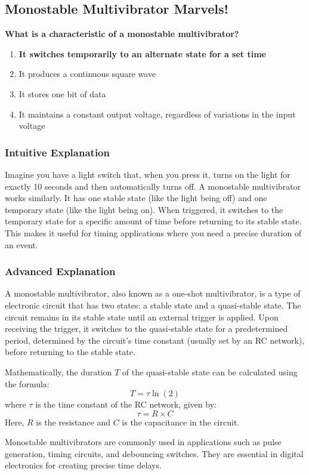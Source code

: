 \subsection{Monostable Multivibrator Marvels!}

\begin{tcolorbox}[colback=gray!10!white,colframe=black!75!black,title=\textbf{E7A06}]
\textbf{What is a characteristic of a monostable multivibrator?}
\begin{enumerate}[label=\Alph*.]
    \item \textbf{It switches temporarily to an alternate state for a set time}
    \item It produces a continuous square wave
    \item It stores one bit of data
    \item It maintains a constant output voltage, regardless of variations in the input voltage
\end{enumerate}
\end{tcolorbox}

\subsubsection{Intuitive Explanation}
Imagine you have a light switch that, when you press it, turns on the light for exactly 10 seconds and then automatically turns off. A monostable multivibrator works similarly. It has one stable state (like the light being off) and one temporary state (like the light being on). When triggered, it switches to the temporary state for a specific amount of time before returning to its stable state. This makes it useful for timing applications where you need a precise duration of an event.

\subsubsection{Advanced Explanation}
A monostable multivibrator, also known as a one-shot multivibrator, is a type of electronic circuit that has two states: a stable state and a quasi-stable state. The circuit remains in its stable state until an external trigger is applied. Upon receiving the trigger, it switches to the quasi-stable state for a predetermined period, determined by the circuit's time constant (usually set by an RC network), before returning to the stable state.

Mathematically, the duration \( T \) of the quasi-stable state can be calculated using the formula:
\[
T = \tau \ln(2)
\]
where \( \tau \) is the time constant of the RC network, given by:
\[
\tau = R \times C
\]
Here, \( R \) is the resistance and \( C \) is the capacitance in the circuit.

Monostable multivibrators are commonly used in applications such as pulse generation, timing circuits, and debouncing switches. They are essential in digital electronics for creating precise time delays.

